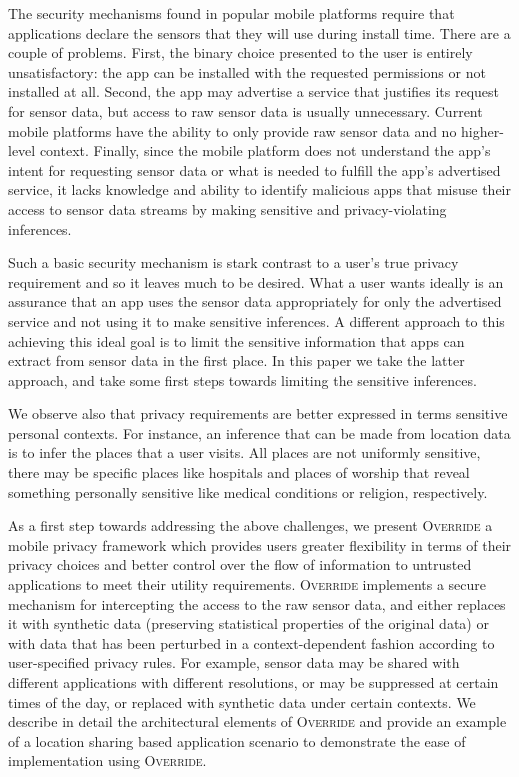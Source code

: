 \documentclass[10pt]{sensys-proc}
\begin{document}
The security mechanisms found in popular mobile platforms require that applications declare the sensors that they will use during install time. There are a couple of problems. First, the binary choice presented to the user is entirely unsatisfactory: the app can be installed with the requested permissions or not installed at all. Second, the app may advertise a service that justifies its request for sensor data, but access to raw sensor data is usually unnecessary. Current mobile platforms have the ability to only provide raw sensor data and no higher-level context. Finally, since the mobile platform does not understand the app's intent for requesting sensor data or what is needed to fulfill the app's advertised service, it lacks knowledge and ability to identify malicious apps that misuse their access to sensor data streams by making sensitive and privacy-violating inferences.

Such a basic security mechanism is stark contrast to a user's true privacy requirement and so it leaves much to be desired. What a user wants ideally is an assurance that an app uses the sensor data appropriately for only the advertised service and not using it to make sensitive inferences. A different approach to this achieving this ideal goal is to limit the sensitive information that apps can extract from sensor data in the first place. In this paper we take the latter approach, and take some first steps towards limiting the sensitive inferences.

We observe also that privacy requirements are better expressed in terms sensitive personal contexts. For instance, an inference that can be made from location data is to infer the places that a user visits. All places are not uniformly sensitive, there may be specific places like hospitals and places of worship that reveal something personally sensitive like medical conditions or religion, respectively.

As a first step towards addressing the above challenges, we present \textsc{Override} a mobile privacy framework which provides users greater flexibility in terms of their privacy choices and better control over the flow of information to untrusted applications to meet their utility requirements. \textsc{Override} implements a secure mechanism for intercepting the access to the raw sensor data, and either replaces it with synthetic data (preserving statistical properties of the original data) or with data that has been perturbed in a context-dependent fashion according to user-specified privacy rules. For example, sensor data may be shared with different applications with different resolutions, or may be suppressed at certain times of the day, or replaced with synthetic data under certain contexts. We describe in detail the architectural elements of \textsc{Override} and provide an example of a location sharing based application scenario to demonstrate the ease of implementation using \textsc{Override}.
\end{document}
